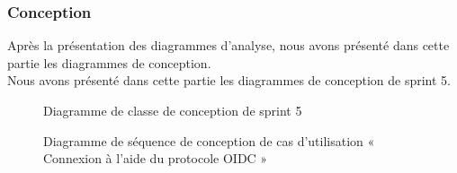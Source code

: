 \subsubsection{Conception}

Après la présentation des diagrammes d'analyse, nous avons présenté dans cette partie les diagrammes de conception.\\ 
Nous avons présenté dans cette partie les diagrammes de conception de sprint 5. \\
\begin{figure}[H]
  \centering
  \caption{Diagramme de classe de conception de sprint 5}
  \label{fig:class_diagram_51}
\end{figure}


\begin{figure}[H]
  \centering
  \caption{Diagramme de séquence de conception de cas d'utilisation « Connexion à l'aide du protocole OIDC »}
  \label{fig:sequence_conception_auth_OIDC}
\end{figure}

